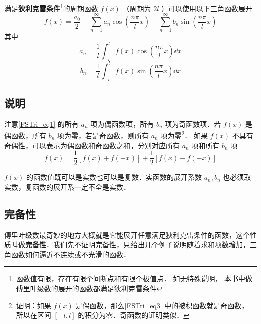


满足\textbf{狄利克雷条件}\footnote{函数值有限，存在有限个间断点和有限个极值点． 如无特殊说明， 本书中做傅里叶级数的展开的函数都满足狄利克雷条件}的周期函数 $f(x)$ （周期为 $2l$ ）可以使用以下三角函数展开
\begin{equation}\label{FSTri_eq1}
f( x ) = \frac{a_0}{2} + \sum_{n = 1}^\infty a_n \cos (\frac{n\pi}{l}x) + \sum_{n = 1}^\infty b_n \sin (\frac{n\pi}{l}x)
\end{equation}
其中
\begin{equation}\label{FSTri_eq2}
a_n = \frac{1}{l} \int_{ - l}^l f( x )\cos(\frac{n\pi}{l}x) \dd{x} 
\end{equation}
\begin{equation}\label{FSTri_eq3}
b_n = \frac{1}{l} \int_{ - l}^l f( x )\sin(\frac{n\pi}{l}x) \dd{x}
\end{equation}

\subsection{说明}
注意\autoref{FSTri_eq1} 的所有 $a_n$ 项为偶函数项，所有 $b_n$ 项为奇函数项．若 $f(x)$ 是偶函数，所有 $b_n$ 项为零，若是奇函数，则所有 $a_n$ 项为零\footnote{证明：如果 $f(x)$ 是偶函数，那么\autoref{FSTri_eq3} 中的被积函数就是奇函数， 所以在区间 $[-l,l]$ 的积分为零．奇函数的证明类似．}． 如果 $f(x)$ 不具有奇偶性，可以表示为偶函数和奇函数之和，分别对应所有 $a_n$ 项和所有 $b_n$ 项
\begin{equation}
f(x) = \frac12 [f(x)+f(-x)] + \frac12 [f(x)-f(-x)]
\end{equation}

$f(x)$ 的函数值既可以是实数也可以是复数．实函数的展开系数 $a_n, b_n$ 也必须取实数，复函数的展开系一定不全是实数．

\subsection{完备性}
傅里叶级数最奇妙的地方大概就是它能展开任意满足狄利克雷条件的函数，这个性质叫做\textbf{完备性}．我们先不证明完备性，只给出几个例子说明随着求和项数增加，三角函数如何逼近不连续或不光滑的函数．

